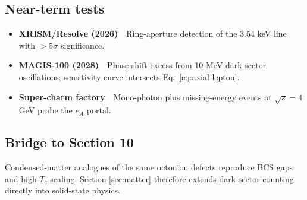 \subsection{Near-term tests}

\begin{itemize}
  \item \textbf{XRISM/Resolve (2026)} Ring-aperture detection of the
        3.54 keV line with $>5\sigma$ significance.
  \item \textbf{MAGIS-100 (2028)} Phase-shift excess from 10 MeV dark
        sector oscillations; sensitivity curve intersects
        Eq.~\eqref{eq:axial-lepton}.
  \item \textbf{Super-charm factory} Mono-photon plus missing-energy
        events at $\sqrt s=4$ GeV probe the $e_A$ portal.
\end{itemize}

\subsection{Bridge to Section 10}

Condensed‐matter analogues of the same octonion defects reproduce BCS
gaps and high-$T_c$ scaling.  Section \ref{sec:matter} therefore extends
dark-sector counting directly into solid-state physics.

\clearpage
